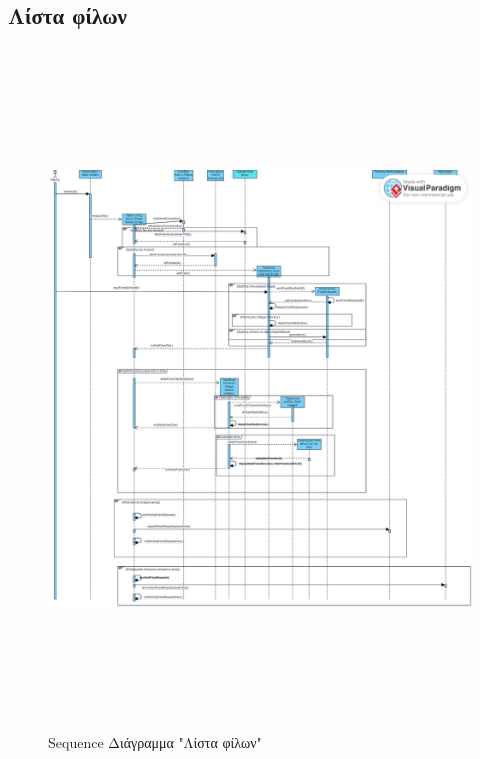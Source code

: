 \subsection{Λίστα φίλων}
\begin{figure}[!htb]
\begin{center}
    \includegraphics[width=\textwidth,height=18cm]{sequence_friends.png}
    \caption{Sequence Διάγραμμα "Λίστα φίλων"}
    \label{}
    \end{center}
\end{figure}
\newpage

